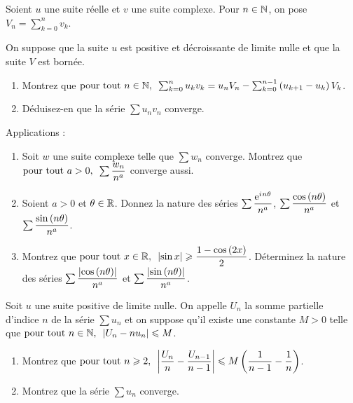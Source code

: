 \begin{corr}
\end{corr}

\begin{exosss}
Soient \(u\) une suite réelle et \(v\) une suite complexe. Pour \(n\in\mathbb{N}\), on pose \(V_n=\sum_{k=0}^nv_k\).

On suppose que la suite \(u\) est positive et décroissante de limite nulle et que la suite \(V\) est bornée.

\begin{enumerate}[series=transformationAbel]
    \item Montrez que \(\quantifs{\tpt n\in\N}\sum_{k=0}^nu_kv_k=u_nV_n-\sum_{k=0}^{n-1}\paren{u_{k+1}-u_k}V_k\). \\
    \item Déduisez-en que la série \(\sum u_nv_n\) converge.
\end{enumerate}

Applications :

\begin{enumerate}[resume=transformationAbel]
    \item Soit \(w\) une suite complexe telle que \(\sum w_n\) converge. Montrez que \(\quantifs{\tpt a>0}\sum\dfrac{w_n}{n^a}\) converge aussi. \\
    \item Soient \(a>0\) et \(\theta\in\mathbb{R}\). Donnez la nature des séries \(\sum\dfrac{\mathrm{e}^{i\mkern1mu n\theta}}{n^a}\), \(\sum\dfrac{\cos\left(n\theta\right)}{n^a}\) et \(\sum\dfrac{\sin\left(n\theta\right)}{n^a}\). \\
    \item Montrez que \(\quantifs{\tpt x\in\R}\abs{\sin x}\geq\dfrac{1-\cos\paren{2x}}{2}\). Déterminez la nature des séries \(\sum\dfrac{\left\lvert\cos\left(n\theta\right)\right\rvert}{n^a}\) et \(\sum\dfrac{\left\lvert\sin\left(n\theta\right)\right\rvert}{n^a}\).
\end{enumerate}
\end{exosss}

\begin{corr}
\end{corr}

\begin{exosss}[Exercice 21]
Soit \(u\) une suite positive de limite nulle. On appelle \(U_n\) la somme partielle d'indice \(n\) de la série \(\sum u_n\) et on suppose qu'il existe une constante \(M>0\) telle que \(\quantifs{\tpt n\in\N}\abs{U_n-nu_n}\leq M\).

\begin{enumerate}
    \item Montrez que \(\quantifs{\tpt n\geq2}\abs{\dfrac{U_n}{n}-\dfrac{U_{n-1}}{n-1}}\leq M\paren{\dfrac{1}{n-1}-\dfrac{1}{n}}\). \\
    \item Montrez que la série \(\sum u_n\) converge.
\end{enumerate}
\end{exosss}

